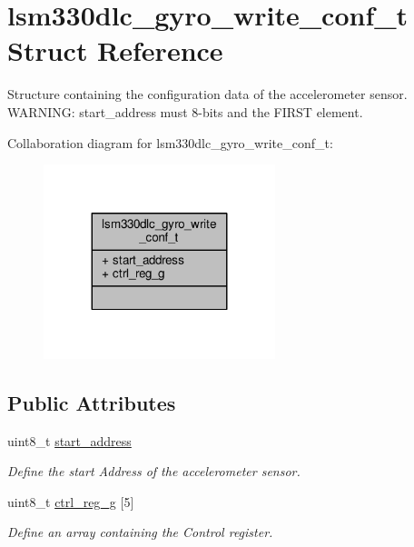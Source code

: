 \hypertarget{structlsm330dlc__gyro__write__conf__t}{\section{lsm330dlc\+\_\+gyro\+\_\+write\+\_\+conf\+\_\+t Struct Reference}
\label{structlsm330dlc__gyro__write__conf__t}
}


Structure containing the configuration data of the accelerometer sensor. W\+A\+R\+N\+I\+N\+G\+: start\+\_\+address must 8-\/bits and the F\+I\+R\+S\+T element.  




Collaboration diagram for lsm330dlc\+\_\+gyro\+\_\+write\+\_\+conf\+\_\+t\+:
\nopagebreak
\begin{figure}[H]
\begin{center}
\leavevmode
\includegraphics[width=191pt]{structlsm330dlc__gyro__write__conf__t__coll__graph}
\end{center}
\end{figure}
\subsection*{Public Attributes}
\begin{DoxyCompactItemize}
\item 
\hypertarget{structlsm330dlc__gyro__write__conf__t_a1d16747a5e6a8a2a4bed9c2e8c0c4087}{uint8\+\_\+t \hyperlink{structlsm330dlc__gyro__write__conf__t_a1d16747a5e6a8a2a4bed9c2e8c0c4087}{start\+\_\+address}}\label{structlsm330dlc__gyro__write__conf__t_a1d16747a5e6a8a2a4bed9c2e8c0c4087}

\begin{DoxyCompactList}\small\item\em Define the start Address of the accelerometer sensor. \end{DoxyCompactList}\item 
\hypertarget{structlsm330dlc__gyro__write__conf__t_acbcff26ec6502a1cbb6566bc956704e1}{uint8\+\_\+t \hyperlink{structlsm330dlc__gyro__write__conf__t_acbcff26ec6502a1cbb6566bc956704e1}{ctrl\+\_\+reg\+\_\+g} \mbox{[}5\mbox{]}}\label{structlsm330dlc__gyro__write__conf__t_acbcff26ec6502a1cbb6566bc956704e1}

\begin{DoxyCompactList}\small\item\em Define an array containing the Control register. \end{DoxyCompactList}\end{DoxyCompactItemize}


